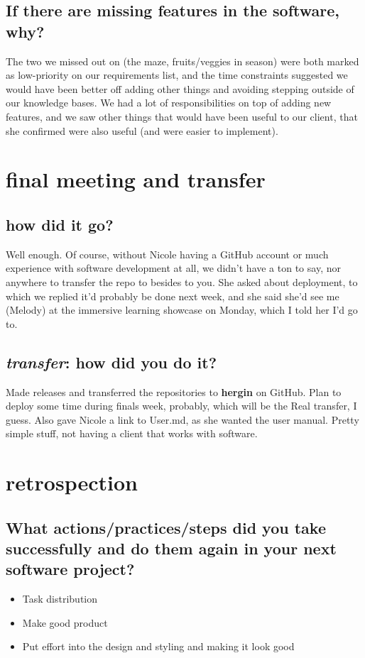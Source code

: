 \documentclass[12pt, letterpaper]{article}
\begin{document}
\subsection{If there are missing features in the software, why?}
	The two we missed out on (the maze, fruits/veggies in season) were both marked as low-priority on our requirements list, and the time constraints suggested we would have been better off adding other things and avoiding stepping outside of our knowledge bases. We had a lot of responsibilities on top of adding new features, and we saw other things that would have been useful to our client, that she confirmed were also useful (and were easier to implement).

\section{final meeting and transfer}
\subsection{how did it go?}
	Well enough. Of course, without Nicole having a GitHub account or much experience with software development at all, 
	we didn't have a ton to say, nor anywhere to transfer the repo to besides to you. She asked about deployment, to which 
	we replied it'd probably be done next week, and she said she'd see me (Melody) at the immersive learning showcase on Monday, 
	which I told her I'd go to.

\subsection{\emph{transfer}: how did you do it?}
	Made releases and transferred the repositories to \textbf{hergin} on GitHub. Plan to deploy some time during finals week, probably, 
	which will be the Real transfer, I guess. Also gave Nicole a link to User.md, as she wanted the user manual. Pretty simple stuff, 
	not having a client that works with software.

\section{retrospection}
\subsection{What actions/practices/steps did you take successfully and do them again in your next software project?}
\begin{itemize}
	\item{Task distribution}
	\item{Make good product}
	\item{Put effort into the design and styling and making it look good}
\end{itemize}
\end{document}

